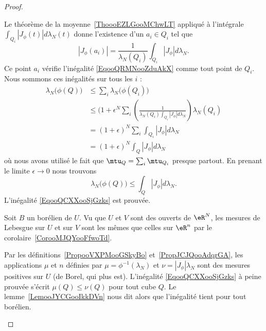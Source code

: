 \begin{proof}
\begin{enumerate}
\begin{subproof}
			      Le théorème de la moyenne~\ref{ThoooEZLGooMChwLT} appliqué à l'intégrale \( \int_{Q_i}| J_{\phi}(t) |d\lambda_N(t)\) donne l'existence d'un \( a_i\in Q_i\) tel que
			      \begin{equation}
				      | J_{\phi}(a_i) |=\frac{1}{ \lambda_N(Q_i) }\int_{Q_i}| J_{\phi} |d\lambda_N.
			      \end{equation}
			      Ce point \( a_i\) vérifie l'inégalité \eqref{EqooQRMNooZduAkX} comme tout point de \( Q_i\). Nous sommons ces inégalités sur tous les \( i\) :
			      \begin{subequations}
				      \begin{align}
					      \lambda_N\big( \phi(Q) \big) & \leq\sum_i\lambda_N\big( \phi(Q_i) \big)                                                                        \\
					                                   & \leq (1+\epsilon^N\sum_i\left( \frac{1}{ \lambda_N(Q_i)\int_{Q_i}| J_{\phi} |d\lambda_N } \right)\lambda_N(Q_i) \\
					                                   & =(1+\epsilon)^N\sum_i\int_{Q_i}| J_{\phi} |d\lambda_N                                                           \\
					                                   & =(1+\epsilon)^N\int_Q| J_{\phi} |d\lambda_N
				      \end{align}
			      \end{subequations}
			      où nous avons utilisé le fait que \( \mtu_Q=\sum_i\mtu_{Q_i}\) presque partout. En prenant le limite \( \epsilon\to 0\) nous trouvons
			      \begin{equation}
				      \lambda_N\big( \phi(Q) \big)\leq \int_Q| J_{\phi} |d\lambda_N.
			      \end{equation}
			      L'inégalité \eqref{EqooQCXXooSjGzks} est prouvée.

			      Soit \( B\) un borélien de \( U\). Vu que \( U\) et \( V\) sont des ouverts de \( \eR^N\), les mesures de Lebesgue sur \( U\) et sur \( V\) sont les mêmes que celles sur \( \eR^n\)  par le corolaire~\ref{CorooMJQYooFfwoTd}.

			      Par les définitions~\ref{PropooVXPMooGSkyBo} et~\ref{PropJCJQooAdqrGA}, les applications \( \mu\) et \( n\) définies par \( \mu=\phi^{-1}(\lambda_N)\) et \( \nu=| J_{\phi} |\lambda_N\) sont des mesures positives sur \( U\) (de Borel, qui plus est). L'inégalité \eqref{EqooQCXXooSjGzks} à peine prouvée s'écrit \( \mu(Q)\leq \nu(Q)\) pour tout cube \( Q\). Le lemme~\ref{LemooJYCGooIkkDVn} nous dit alors que l'inégalité tient pour tout borélien.


\end{subproof}
\end{enumerate}
\end{proof}

